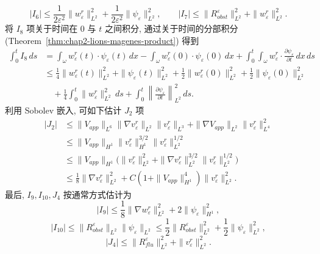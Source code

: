 \begin{sloppypar}
{\[
 |I_6|\leq\frac1{2\varepsilon^2}\|w_\varepsilon^r\|_{L^2}^2
 +\frac1{2\varepsilon^2}\|\psi_\varepsilon\|_{L^2}^2,
 \qquad
 |I_7|\leq\|R_{obst}^\varepsilon\|_{L^2}^2+\|w_\varepsilon^r\|_{L^2}^2.
\]
将 $I_8$ 项关于时间在 $0$ 与 $t$ 之间积分, 通过关于时间的分部积分 (Theorem~\ref{thm:chap2-lions-magenes-product}) 得到
\[
\begin{split}
 \int_0^t I_8\,ds
 &=\int_\omega w_\varepsilon^r(t)\cdot\psi_\varepsilon(t)\,dx
 -\int_\omega w_\varepsilon^r(0)\cdot\psi_\varepsilon(0)\,dx
 +\int_0^t\int_\omega w_\varepsilon^r\cdot\frac{\partial\psi_\varepsilon}{\partial t}\,dx\,ds\\
 &\leq\frac14\|w_\varepsilon^r(t)\|_{L^2}^2+\|\psi_\varepsilon(t)\|_{L^2}^2
 +\frac12\|w_\varepsilon^r(0)\|_{L^2}^2+\frac12\|\psi_\varepsilon(0)\|_{L^2}^2\\
 &\quad+\frac14\int_0^t\|w_\varepsilon^r\|_{L^2}^2\,ds
 +\int_0^t\left\|\frac{\partial\psi_\varepsilon}{\partial t}\right\|_{L^2}^2\,ds.
\end{split}
\]
利用 Sobolev 嵌入, 可如下估计 $J_2$ 项
\[
\begin{split}
 |J_2|&\leq\|V_{app}\|_{L^6}\|\nabla v_\varepsilon^r\|_{L^2}\|v_\varepsilon^r\|_{L^3}
 +\|\nabla V_{app}\|_{L^2}\|v_\varepsilon^r\|_{L^4}^2\\
 &\leq\|V_{app}\|_{H^1}\|v_\varepsilon^r\|_{H^1}^{3/2}\|v_\varepsilon^r\|_{L^2}^{1/2}\\
 &\leq\|V_{app}\|_{H^1}\bigl(\|v_\varepsilon^r\|_{L^2}^2
 +\|\nabla v_\varepsilon^r\|_{L^2}^{3/2}\|v_\varepsilon^r\|_{L^2}^{1/2}\bigr)\\
 &\leq\frac18\|\nabla v_\varepsilon^r\|_{L^2}^2
 +C(1+\|V_{app}\|_{H^1}^4)\|v_\varepsilon^r\|_{L^2}^2.
\end{split}
\]
最后, $I_9,I_{10},J_4$ 按通常方式估计为
\[
 |I_9|\leq\frac18\|\nabla w_\varepsilon^r\|_{L^2}^2+2\|\psi_\varepsilon\|_{H^1}^2,
\]
\[
 |I_{10}|\leq\|R_{obst}^\varepsilon\|_{L^2}\|\psi_\varepsilon\|_{L^2}
 \leq\frac12\|R_{obst}^\varepsilon\|_{L^2}^2+\frac12\|\psi_\varepsilon\|_{L^2}^2,
\]
\[
 |J_4|\leq\|R_{flu}^\varepsilon\|_{L^2}^2+\|v_\varepsilon^r\|_{L^2}^2.
\]

}
\end{sloppypar}
